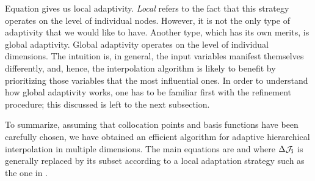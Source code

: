 Equation  gives us local adaptivity. \emph{Local} refers to the
fact that this strategy operates on the level of individual nodes. However, it
is not the only type of adaptivity that we would like to have. Another type,
which has its own merits, is global adaptivity. Global adaptivity operates on
the level of individual dimensions. The intuition is, in general, the input
variables manifest themselves differently, and, hence, the interpolation
algorithm is likely to benefit by prioritizing those variables that the most
influential ones. In order to understand how global adaptivity works, one has to
be familiar first with the refinement procedure; this discussed is left to the
next subsection.

To summarize, assuming that collocation points and basis functions have been
carefully chosen, we have obtained an efficient algorithm for adaptive
hierarchical interpolation in multiple dimensions. The main equations are
 and  where $\Delta\mathcal{J}_{\mathbf{i}}$ is
generally replaced by its subset according to a local adaptation strategy such
as the one in .
